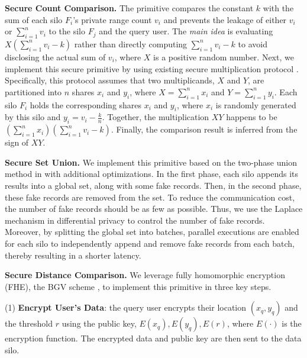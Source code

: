 \textbf{Secure Count Comparison.}
The primitive compares the constant $k$ with the sum of each silo $F_i$'s private range count $v_i$ and prevents the leakage of either $v_i$ or $\sum_{i=1}^nv_i$ to the silo $F_j$ and the query user.
The \textit{main idea} is evaluating $X(\sum_{i=1}^nv_i - k)$ rather than directly computing $\sum_{i=1}^nv_i - k$ to avoid disclosing the actual sum of $v_i$, where $X$ is a positive random number.
Next, we implement this secure primitive by using existing secure multiplication protocol \cite{DBLP:conf/esorics/BogdanovLW08}.
Specifically, this protocol \cite{DBLP:conf/esorics/BogdanovLW08} assumes that two multiplicands, $X$ and $Y$, are partitioned into $n$ shares $x_i$ and $y_i$, where $X=\sum_{i=1}^n{x_i}$ and $Y =\sum_{i=1}^n{y_i}$.
Each silo $F_i$ holds the corresponding shares $x_i$ and $y_i$,
where $x_i$ is randomly generated by this silo and $y_i = v_i - \frac{k}{n}$.
Together, the multiplication $XY$ happens to be $(\sum_{i=1}^nx_i)(\sum_{i=1}^n{v_i} - k)$.
Finally, the comparison result is inferred from the sign of $XY$.

\textbf{Secure Set Union.}
We implement this primitive based on the two-phase union method in \cite{DBLP:conf/socialcom/JurczykX11} with additional optimizations.
In the first phase, each silo appends its results into a global set, along with some fake records.
Then, in the second phase, these fake records are removed from the set. 
To reduce the communication cost, the number of fake records should be as few as possible.
Thus, we use the Laplace mechanism \cite{DBLP:series/synthesis/2016Li} in differential privacy to control the number of fake records.
Moreover, by splitting the global set into batches, parallel executions are enabled for each silo to independently append and remove fake records from each batch, thereby resulting in a shorter latency.

\textbf{Secure Distance Comparison.}
We leverage fully homomorphic encryption (FHE), the BGV scheme \cite{DBLP:journals/csur/AcarAUC18}, to implement this primitive in three key steps.

(1) \textbf{Encrypt User's Data}: the query user encrypts their location $(x_q, y_q)$ and the threshold $r$ using the public key, \ie $E(x_q), E(y_q), E(r)$, where $E(\cdot)$ is the encryption function. The encrypted data and public key are then sent to the data silo.


